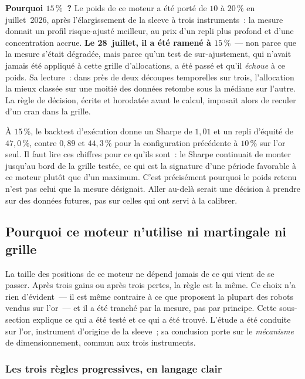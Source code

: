 \documentclass[11pt, a4paper]{scrartcl}
\begin{document}
\begin{insightbox}
\textbf{Pourquoi $15\,\%$~?} Le poids de ce moteur a été porté de $10$ à $20\,\%$
en juillet~2026, après l'élargissement de la sleeve à trois instruments~: la mesure
donnait un profil risque-ajusté meilleur, au prix d'un repli plus profond et d'une
concentration accrue. \textbf{Le 28~juillet, il a été ramené à $15\,\%$}~--- non
parce que la mesure s'était dégradée, mais parce qu'un test de sur-ajustement, qui
n'avait jamais été appliqué à cette grille d'allocations, a été passé et qu'il
\emph{échoue} à ce poids. Sa lecture~: dans près de deux découpes temporelles sur
trois, l'allocation la mieux classée sur une moitié des données retombe sous la
médiane sur l'autre. La règle de décision, écrite et horodatée avant le calcul,
imposait alors de reculer d'un cran dans la grille.

\smallskip
À $15\,\%$, le backtest d'exécution donne un Sharpe de $1{,}01$ et un repli
d'équité de $47{,}0\,\%$, contre $0{,}89$ et $44{,}3\,\%$ pour la configuration
précédente à $10\,\%$ sur l'or seul. Il faut lire ces chiffres pour ce qu'ils
sont~: le Sharpe continuait de monter jusqu'au bord de la grille testée, ce qui est
la signature d'une période favorable à ce moteur plutôt que d'un maximum. C'est
précisément pourquoi le poids retenu n'est pas celui que la mesure désignait.
Aller au-delà serait une décision à prendre sur des données futures, pas sur celles
qui ont servi à la calibrer.
\end{insightbox}

\subsection{Pourquoi ce moteur n'utilise ni martingale ni grille}
\label{sec:gold_sizing_pedago}

La taille des positions de ce moteur ne dépend jamais de ce qui vient de se
passer. Après trois gains ou après trois pertes, la règle est la même. Ce choix
n'a rien d'évident~--- il est même contraire à ce que proposent la plupart des
robots vendus sur l'or~--- et il a été tranché par la mesure, pas par principe.
Cette sous-section explique ce qui a été testé et ce qui a été trouvé. L'étude a
été conduite sur l'or, instrument d'origine de la sleeve~; sa conclusion porte sur
le \emph{mécanisme} de dimensionnement, commun aux trois instruments.

\subsubsection*{Les trois règles progressives, en langage clair}
\end{document}
